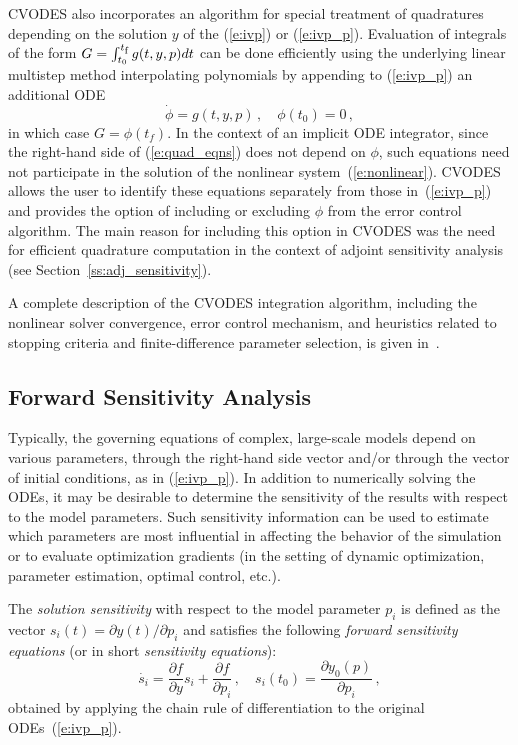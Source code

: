 CVODES also incorporates an algorithm for special treatment of
quadratures depending on the solution $y$ of the (\ref{e:ivp}) or
(\ref{e:ivp_p}). Evaluation of integrals of the form
$G = \int_{t_0}^{t_\mb{f}} g(t,y,p) dt$ can be done efficiently using the
underlying linear multistep method interpolating polynomials by
appending to (\ref{e:ivp_p}) an additional ODE
\begin{equation}\label{e:quad_eqns}
\dot\phi = g(t,y,p) \, , \quad \phi(t_0) = 0 \, ,
\end{equation}
in which case $G = \phi(t_f)$. In the context of an implicit ODE
integrator, since the right-hand side of (\ref{e:quad_eqns}) does not
depend on $\phi$, such equations need not participate in the solution of
the nonlinear system~(\ref{e:nonlinear}). CVODES allows the user to
identify these equations separately from those in~(\ref{e:ivp_p}) and
provides the option of including or excluding $\phi$ from the error
control algorithm.
%
The main reason for including this option in CVODES was the need for
efficient quadrature computation in the context of adjoint sensitivity 
analysis (see Section~\ref{ss:adj_sensitivity}).

A complete description of the CVODES integration algorithm, including 
the nonlinear solver convergence, error control mechanism, and heuristics 
related to stopping criteria and finite-difference parameter selection, is
given in~\cite{HBGLSSW:03}.


\subsection{Forward Sensitivity Analysis}\label{ss:fwd_sensitivity}

Typically, the governing equations of complex, large-scale models
depend on various parameters,  through the right-hand side vector 
and/or through the vector of initial conditions, as in (\ref{e:ivp_p}).
In addition to numerically solving the ODEs, it may be desirable to
determine the sensitivity of the results with respect to the model
parameters. 
Such sensitivity information can be used to estimate which
parameters are most influential in affecting the behavior of the
simulation or to evaluate optimization gradients (in the setting of dynamic
optimization, parameter estimation, optimal control, etc.).

The {\em solution sensitivity} with respect to the model parameter
$p_i$ is defined as the vector 
$s_i (t) = {\partial y(t)}/{\partial p_i}$
and satisfies the following {\em forward sensitivity equations}
(or in short {\em sensitivity equations}):
\begin{equation}\label{e:sens_eqns}
\dot{s_i}  = \frac{\partial f}{\partial y} s_i + \frac{\partial f}{\partial p_i} \, ,
\quad s_i(t_0)  = \frac{\partial y_{0}(p)}{\partial p_i} \, ,
\end{equation}
obtained by applying the chain rule of differentiation to the original
ODEs~(\ref{e:ivp_p}). 

